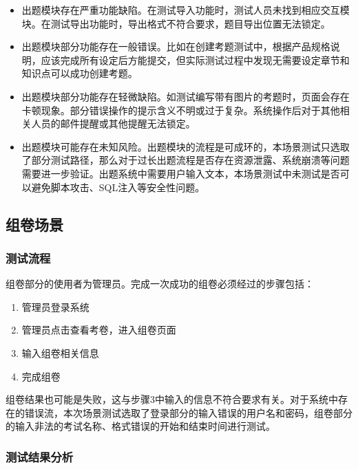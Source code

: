 \documentclass[hyperref, a4paper]{ctexart}
\begin{document}
\begin{itemize}
\item
  出题模块存在严重功能缺陷。在测试导入功能时，测试人员未找到相应交互模块。在测试导出功能时，导出格式不符合要求，题目导出位置无法锁定。
\item
  出题模块部分功能存在一般错误。比如在创建考题测试中，根据产品规格说明，应该完成所有设定后方能提交，但实际测试过程中发现无需要设定章节和知识点可以成功创建考题。
\item
  出题模块部分功能存在轻微缺陷。如测试编写带有图片的考题时，页面会存在卡顿现象。部分错误操作的提示含义不明或过于复杂。系统操作后对于其他相关人员的邮件提醒或其他提醒无法锁定。
\item
  出题模块可能存在未知风险。出题模块的流程是可成环的，本场景测试只选取了部分测试路径，那么对于过长出题流程是否存在资源泄露、系统崩溃等问题需要进一步验证。出题系统中需要用户输入文本，本场景测试中未测试是否可以避免脚本攻击、SQL注入等安全性问题。
\end{itemize}

\hypertarget{ux7ec4ux5377ux573aux666f}{%
\subsection{组卷场景}\label{ux7ec4ux5377ux573aux666f}}

\hypertarget{ux6d4bux8bd5ux6d41ux7a0b-1}{%
\subsubsection{测试流程}\label{ux6d4bux8bd5ux6d41ux7a0b-1}}

组卷部分的使用者为管理员。完成一次成功的组卷必须经过的步骤包括：

\begin{enumerate}
\def\labelenumi{\arabic{enumi}.}
\item
  管理员登录系统
\item
  管理员点击查看考卷，进入组卷页面
\item
  输入组卷相关信息
\item
  完成组卷
\end{enumerate}

组卷结果也可能是失败，这与步骤3中输入的信息不符合要求有关。对于系统中存在的错误流，本次场景测试选取了登录部分的输入错误的用户名和密码，组卷部分的输入非法的考试名称、格式错误的开始和结束时间进行测试。

\hypertarget{ux6d4bux8bd5ux7ed3ux679cux5206ux6790-1}{%
\subsubsection{测试结果分析}\label{ux6d4bux8bd5ux7ed3ux679cux5206ux6790-1}}
\end{document}

